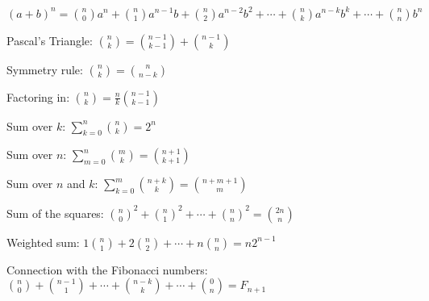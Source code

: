 $ (a+b)^n = \binom n 0 a^n + \binom n 1 a^{n-1} b + \binom n 2 a^{n-2} b^2 + \cdots + \binom n k a^{n-k} b^k + \cdots + \binom n n b^n $ 

Pascal's Triangle:
$ \binom n k = \binom {n-1} {k-1} + \binom {n-1} k $ 

Symmetry rule:
$ \binom n k = \binom n {n-k} $

Factoring in:
$ \binom n k = \frac n k \binom {n-1} {k-1} $

Sum over $k$:
$ \sum_{k = 0}^n \binom n k = 2 ^ n $

Sum over $n$:
$ \sum_{m = 0}^n \binom m k = \binom {n + 1} {k + 1} $

Sum over $n$ and $k$:
$ \sum_{k = 0}^m  \binom {n + k} k = \binom {n + m + 1} m $

Sum of the squares:
$ {\binom n 0}^2 + {\binom n 1}^2 + \cdots + {\binom n n}^2 = \binom {2n} n $

Weighted sum:
$ 1 \binom n 1 + 2 \binom n 2 + \cdots + n \binom n n = n 2^{n-1} $

Connection with the Fibonacci numbers:
$ \binom n 0 + \binom {n-1} 1 + \cdots + \binom {n-k} k + \cdots + \binom 0 n = F_{n+1} $
